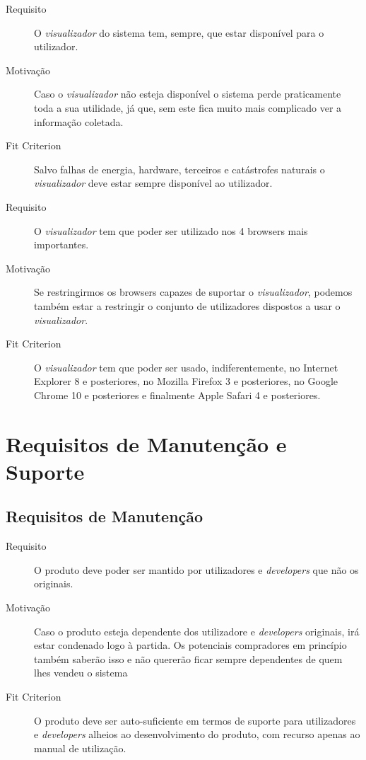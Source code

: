 \begin{description}
\item[Requisito] O \emph{visualizador} do sistema tem, sempre, que estar disponível para o utilizador.
\item[Motivação] Caso o \emph{visualizador} não esteja disponível o sistema perde praticamente toda a sua utilidade, já que, sem este fica muito mais 
complicado ver a informação coletada.
\item[Fit Criterion] Salvo falhas de energia, hardware, terceiros e catástrofes naturais o \emph{visualizador} deve estar sempre disponível ao utilizador. 
\end{description}




\begin{description}
\item[Requisito] O \emph{visualizador} tem que poder ser utilizado nos 4 browsers mais importantes.
\item[Motivação] Se restringirmos os browsers capazes de suportar o \emph{visualizador}, podemos também estar a restringir 
o conjunto de utilizadores dispostos a usar o \emph{visualizador}.
\item[Fit Criterion] O \emph{visualizador} tem que poder ser usado, indiferentemente, no Internet Explorer 8 e posteriores, no Mozilla Firefox 3 e 
posteriores, no Google Chrome 10 e posteriores e finalmente Apple Safari 4 e posteriores.
\end{description}



\section{Requisitos de Manutenção e Suporte}
\subsection{Requisitos de Manutenção}
\begin{description}
\item[Requisito] O produto deve poder ser mantido por utilizadores e \emph{developers} que não os originais.
\item[Motivação] Caso o produto esteja dependente dos utilizadore e \emph{developers} originais, irá estar condenado logo à partida. Os potenciais 
compradores em princípio também saberão isso e não quererão ficar sempre dependentes de quem lhes vendeu o sistema
\item[Fit Criterion] O produto deve ser auto-suficiente em termos de suporte para utilizadores e \emph{developers} alheios ao desenvolvimento 
do produto, com recurso apenas ao manual de utilização.
\end{description}

